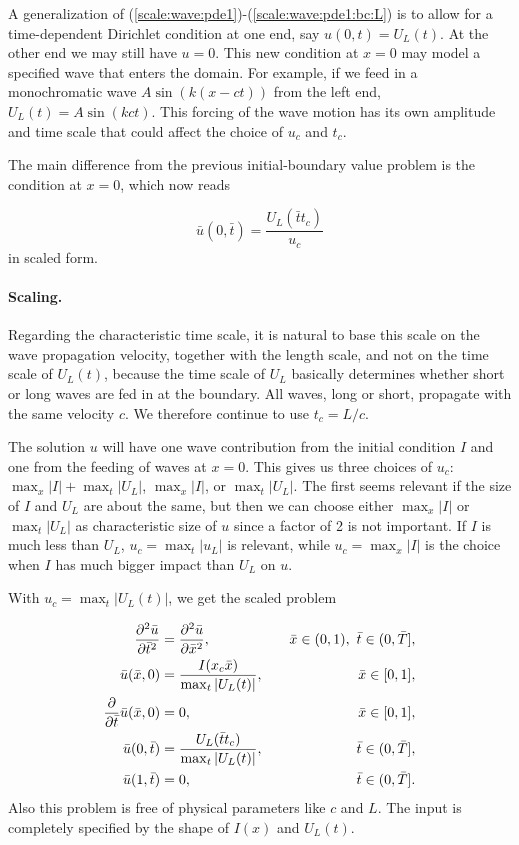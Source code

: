 \documentclass[graybox,envcountchap,sectrefs,final]{svmonodo}
\begin{document}
A generalization of (\ref{scale:wave:pde1})-(\ref{scale:wave:pde1:bc:L})
is to allow for a time-dependent Dirichlet condition at one end, say
$u(0,t)=U_L(t)$. At the other end we may still have $u=0$.  This new
condition at $x=0$ may model a specified wave that enters the
domain. For example, if we feed in a monochromatic wave
$A\sin(k(x-ct))$ from the left end, $U_L(t)=A\sin (kct)$.  This
forcing of the wave motion has its own amplitude and time scale that
could affect the choice of $u_c$ and $t_c$.

The main difference from the previous initial-boundary value problem
is the condition at $x=0$, which now reads

\[ \bar u(0,\bar t) = \frac{U_L(\bar t t_c)}{u_c}\]
in scaled form.

\paragraph{Scaling.}
Regarding the characteristic time scale, it is natural to base this
scale on the wave propagation velocity, together with the length
scale, and not on the time scale of $U_L(t)$, because the time scale
of $U_L$ basically determines whether short or long waves are fed in
at the boundary. All waves, long or short, propagate with the same
velocity $c$. We therefore continue to use $t_c=L/c$.

The solution $u$ will have one wave contribution from the initial
condition $I$ and one from the feeding of waves at $x=0$. This gives
us three choices of $u_c$: $\max_x |I| + \max_t |U_L|$, $\max_x |I|$,
or $\max_t |U_L|$. The first seems relevant if the size of $I$ and
$U_L$ are about the same, but then we can choose either $\max_x |I|$
or $\max_t |U_L|$ as characteristic size of $u$ since a factor of 2 is
not important. If $I$ is much less than $U_L$, $u_c=\max_t |u_L|$ is
relevant, while $u_c=\max_x|I|$ is the choice when $I$ has much bigger
impact than $U_L$ on $u$.

With $u_c=\max_t |U_L(t)|$, we get the scaled problem

\begin{align}
\frac{\partial^2 \bar u}{\partial \bar t^2} &=
{\partial^2 \bar u\over\partial \bar x^2},
\quad & \bar x\in (0,1),\ \bar t\in (0,\bar T],
\label{scale:wave:pde2:d}\\ 
\bar u(\bar x,0) &= \frac{I(x_c\bar x)}{\max_t |U_L(t)|},
\quad &\bar x\in [0,1],
\label{scale:wave:pde2:ic:u:d}\\ 
{\partial\over\partial \bar t}\bar u(\bar x,0) &= 0,
\quad & \bar x\in [0,1],
\label{scale:wave:pde2:ic:ut:d}\\ 
\bar u(0,\bar t) & = \frac{U_L(\bar tt_c)}{\max_t |U_L(t)|},
\quad  &\bar t\in (0,\bar T],
\label{scale:wave:pde2:bc:0:d}\\ 
\bar u(1,\bar t) & = 0,
\quad &\bar t\in (0,\bar T].
\label{scale:wave:pde2:bc:L:d}
\end{align}
Also this problem is free of physical parameters like $c$ and $L$.
The input is completely specified by the shape of $I(x)$ and $U_L(t)$.
\end{document}
